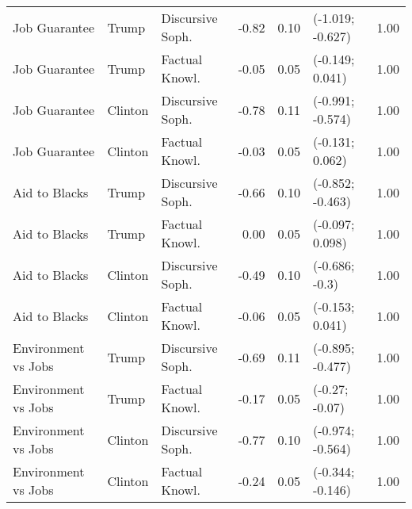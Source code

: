 \begin{table}[ht]
\begin{tabular}{lllrrlr}
  Job Guarantee & Trump & Discursive Soph. & -0.82 & 0.10 & (-1.019; -0.627) & 1.00 \\ 
  Job Guarantee & Trump & Factual Knowl. & -0.05 & 0.05 & (-0.149; 0.041) & 1.00 \\ 
  Job Guarantee & Clinton & Discursive Soph. & -0.78 & 0.11 & (-0.991; -0.574) & 1.00 \\ 
  Job Guarantee & Clinton & Factual Knowl. & -0.03 & 0.05 & (-0.131; 0.062) & 1.00 \\ 
  Aid to Blacks & Trump & Discursive Soph. & -0.66 & 0.10 & (-0.852; -0.463) & 1.00 \\ 
  Aid to Blacks & Trump & Factual Knowl. & 0.00 & 0.05 & (-0.097; 0.098) & 1.00 \\ 
  Aid to Blacks & Clinton & Discursive Soph. & -0.49 & 0.10 & (-0.686; -0.3) & 1.00 \\ 
  Aid to Blacks & Clinton & Factual Knowl. & -0.06 & 0.05 & (-0.153; 0.041) & 1.00 \\ 
  Environment vs Jobs & Trump & Discursive Soph. & -0.69 & 0.11 & (-0.895; -0.477) & 1.00 \\ 
  Environment vs Jobs & Trump & Factual Knowl. & -0.17 & 0.05 & (-0.27; -0.07) & 1.00 \\ 
  Environment vs Jobs & Clinton & Discursive Soph. & -0.77 & 0.10 & (-0.974; -0.564) & 1.00 \\ 
  Environment vs Jobs & Clinton & Factual Knowl. & -0.24 & 0.05 & (-0.344; -0.146) & 1.00 \\ 
   \hline
\end{tabular}
\end{table}
